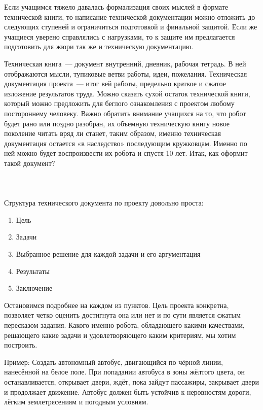 Если учащимся тяжело давалась формализация своих мыслей в формате технической книги, то написание технической документации можно отложить до следующих ступеней и ограничиться подготовкой и финальной защитой. Если же учащиеся уверено справлялись с нагрузками, то к защите им предлагается подготовить для жюри так же и техническую документацию.

Техническая книга~--- документ внутренний, дневник, рабочая тетрадь. В ней отображаются мысли, тупиковые ветви работы, идеи, пожелания. Техническая документация проекта~--- итог вей работы, предельно краткое и сжатое изложение результатов труда. Можно сказать сухой остаток технической книги, который можно предложить для беглого ознакомления с проектом любому постороннему человеку. Важно обратить внимание учащихся на то, что робот будет рано или поздно разобран, их объемную техническую книгу новое поколение читать вряд ли станет, таким образом, именно техническая документация остается «в наследство» последующим кружковцам. Именно по ней можно будет воспроизвести их робота и спустя 10 лет. Итак, как оформит такой документ?\\\\

{\hypertarget{lesson29x2}{}}\\\\

Структура технического документа по проекту довольно проста:

\begin{enumerate}
	\item Цель
	\item Задачи
	\item Выбранное решение для каждой задачи и  его аргументация
	\item Результаты 
	\item Заключение 
\end{enumerate}

Остановимся подробнее на каждом из пунктов. Цель проекта конкретна, позволяет четко оценить достигнута она или нет и по сути является сжатым пересказом задания. Какого именно робота, обладающего какими качествами, решающего какие задачи и удовлетворяющего каким критериям, мы хотим построить.

Пример: Создать автономный автобус, двигающийся по чёрной линии, нанесённой на белое поле. При попадании автобуса в зоны жёлтого цвета, он останавливается, открывает двери, ждёт, пока зайдут пассажиры, закрывает двери и продолжает движение. Автобус должен быть устойчив к неровностям дороги, лёгким землетрясениям и погодным условиям.

